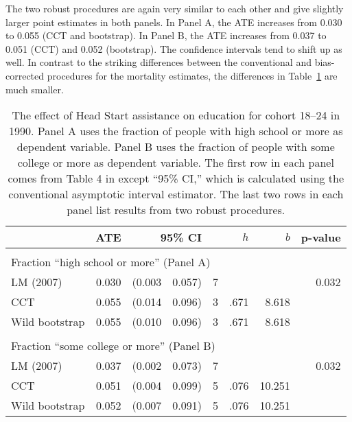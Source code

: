 \documentclass[12pt,fleqn]{article}
\begin{document}
The two robust procedures are again very similar to each other and give slightly
larger point estimates in both panels. In Panel A, the ATE increases from 0.030
to 0.055 (CCT and bootstrap). In Panel B, the ATE increases from 0.037
to 0.051 (CCT) and 0.052 (bootstrap). The confidence intervals tend to shift up
as well.  In contrast to the striking differences between the conventional
and bias-corrected procedures for the mortality estimates, the differences
in Table~\ref{tbl:3} are much smaller.

\begin{table}[t]
  \centering
  \begin{tabular}{lrr@{, }rr@{}rrr}
    \toprule
                   & ATE   & \multicolumn{2}{r}{95\% CI} & & $h$     & $b$ & p-value     \\
    \midrule                                                                          \\
    \multicolumn{5}{l}{Fraction ``high school or more'' (Panel A)}                    \\
    \midrule
    LM (2007)      & 0.030 & (0.003                      & 0.057) & 7&     &  & 0.032    \\
    CCT            & 0.055 & (0.014                      & 0.096) & 3&.671 & 8.618       \\
    Wild bootstrap & 0.055 & (0.010                      & 0.096) & 3&.671 & 8.618       \\\\
    \multicolumn{5}{l}{Fraction ``some college or more'' (Panel B)}                   \\
    \midrule
    LM (2007)      & 0.037 & (0.002                      & 0.073) & 7&     &  & 0.032 \T \\
    CCT            & 0.051 & (0.004                      & 0.099) & 5&.076 & 10.251      \\
    Wild bootstrap & 0.052 & (0.007                      & 0.091) & 5&.076 & 10.251      \\
    \bottomrule
  \end{tabular}
  \caption{The effect of Head Start assistance on education for cohort
    18--24 in 1990. Panel A uses the fraction of people with high school
    or more as dependent variable. Panel B uses the fraction of people
    with some college or more as dependent variable. The first row in
    each panel comes from Table 4 in \cite{ludwig2007} except ``95\% CI,''
    which is calculated using the conventional asymptotic interval estimator.
    The last two rows in
    each panel list results from two robust procedures.}
  \label{tbl:3}
\end{table}
\end{document}

